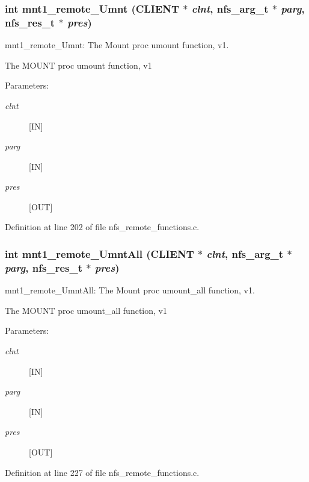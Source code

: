 \subsubsection{\setlength{\rightskip}{0pt plus 5cm}int mnt1\_\-remote\_\-Umnt (CLIENT $\ast$ {\em clnt}, nfs\_\-arg\_\-t $\ast$ {\em parg}, nfs\_\-res\_\-t $\ast$ {\em pres})}\label{group__MNTprocs_ga3}


mnt1\_\-remote\_\-Umnt: The Mount proc umount function, v1.

The MOUNT proc umount function, v1

\begin{Desc}
\item[Parameters:]
\begin{description}
\item[{\em clnt}][IN] \item[{\em parg}][IN] \item[{\em pres}][OUT] \end{description}
\end{Desc}


Definition at line 202 of file nfs\_\-remote\_\-functions.c.
\subsubsection{\setlength{\rightskip}{0pt plus 5cm}int mnt1\_\-remote\_\-Umnt\-All (CLIENT $\ast$ {\em clnt}, nfs\_\-arg\_\-t $\ast$ {\em parg}, nfs\_\-res\_\-t $\ast$ {\em pres})}\label{group__MNTprocs_ga4}


mnt1\_\-remote\_\-Umnt\-All: The Mount proc umount\_\-all function, v1.

The MOUNT proc umount\_\-all function, v1

\begin{Desc}
\item[Parameters:]
\begin{description}
\item[{\em clnt}][IN] \item[{\em parg}][IN] \item[{\em pres}][OUT] \end{description}
\end{Desc}


Definition at line 227 of file nfs\_\-remote\_\-functions.c.
